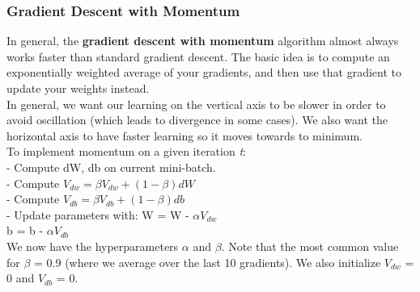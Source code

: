 \documentclass[11pt, a4paper]{article}
\begin{document}
\begin{spacing}{1.1}
	\subsubsection{Gradient Descent with Momentum}
	In general, the \textbf{gradient descent with momentum} algorithm almost always works faster than standard gradient descent. The basic idea is to compute an exponentially weighted average of your gradients, and then use that gradient to update your weights instead. \vspace*{1mm} \\
	In general, we want our learning on the vertical axis to be slower in order to avoid oscillation (which leads to divergence in some cases).  We also want the horizontal axis to have faster learning so it moves towards to minimum. \vspace*{1mm} \\
	To implement momentum on a given iteration \textit{t}: \\
	\hspace*{3mm} - Compute dW, db on current mini-batch. \\
	\hspace*{3mm} - Compute $V_{dw} = \beta V_{dw} + (1-\beta)dW$ \\
	\hspace*{3mm} - Compute $V_{db} = \beta V_{db} + (1-\beta)db$ \\
	\hspace*{3mm} - Update parameters with: W = W - $\alpha V_{dw}$ \\
	\hspace*{50mm} b = b - $\alpha V_{db}$ \vspace*{1mm} \\
	We now have the hyperparameters $\alpha$ and $\beta$. Note that the most common value for $\beta$ = 0.9 (where we average over the last 10 gradients). We also initialize $V_{dw}$ = 0 and $V_{db}$ = 0. 

\end{spacing}
\end{document}
